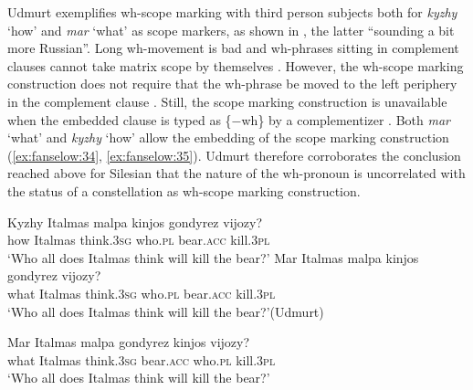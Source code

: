 \documentclass[output=paper,colorlinks,citecolor=brown]{langscibook}
\begin{document}
\begin{otherlanguage}{english}
\noindent Udmurt exemplifies wh-scope marking with third person subjects both for \textit{kyzhy} ‘how' and \textit{mar} ‘what' as scope markers, as shown in , the latter “sounding a bit more Russian”. Long wh-movement is bad  and wh-phrases sitting in complement clauses cannot take matrix scope by themselves . However, the wh-scope marking construction does not require that the wh-phrase be moved to the left periphery in the complement clause . Still, the scope marking construction is unavailable when the embedded clause is typed as \{$-$wh\} by a complementizer . Both \textit{mar} ‘what' and \textit{kyzhy} ‘how' allow the embedding of the scope marking construction (\ref{ex:fanselow:34}, \ref{ex:fanselow:35}).  Udmurt therefore corroborates the conclusion reached above for Silesian that the nature of the wh-pronoun is uncorrelated with the status of a constellation as wh-scope marking construction.

\ea\label{ex:fanselow:30}
\ea     
\gll  Kyzhy 	Italmas 	malpa  	kinjos 		gondyrez 	vijozy? \\
     how Italmas think.3\textsc{sg} who.\textsc{pl} bear.\textsc{acc} kill.3\textsc{pl} \\
\glt ‘Who all does Italmas think will kill the bear?'
\label{ex:fanselow:30a}
\ex     
\gll  Mar  	Italmas 	malpa  	kinjos 		gondyrez 	vijozy?  \\
      what Italmas think.3\textsc{sg} who.\textsc{pl} bear.\textsc{acc} kill.3\textsc{pl}   \\
\glt ‘Who all does Italmas think will kill the bear?'\hfill (Udmurt)
\label{ex:fanselow:30b}
\z\z

    \label{ex:fanselow:31}
    \z

    \label{ex:fanselow:32}
    \z   

\ea\label{ex:fanselow:33}
\ea     
\gll   Mar  	Italmas 	malpa  	gondyrez 	kinjos 		vijozy? \\
     what Italmas think.3\textsc{sg} bear.\textsc{acc} who.\textsc{pl} kill.3\textsc{pl} \\
\glt ‘Who all does Italmas think will kill the bear?'
\label{ex:fanselow:33a}
\label{ex:fanselow:33b}
\z\z


\end{otherlanguage}
\end{document}
